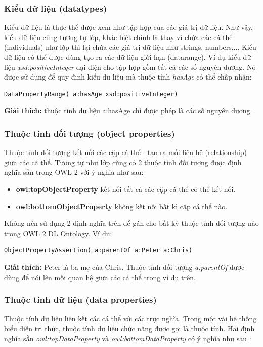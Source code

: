 \subsubsection{Kiểu dữ liệu (datatypes)}
Kiểu dữ liệu là thực thể được xem như tập hợp của các giá trị dữ liệu. Như vậy, kiểu dữ liệu cũng tương tự lớp, khác biệt chính là thay vì chứa các cá thể (individuals) như lớp thì lại chứa các giá trị dữ liệu như strings, numbers,... Kiểu dữ liệu có thể được dùng tạo ra các dữ liệu giới hạn (datarange). Ví dụ kiểu dữ liệu \textit{xsd:positiveInteger} đại diện cho tập hợp gồm tất cả các số nguyên dương. Nó được sử dụng để quy định kiểu dữ liệu mà thuộc tính \textit{hasAge} có thể chấp nhận:


\begin{verbatim}
DataPropertyRange( a:hasAge xsd:positiveInteger) 
\end{verbatim}

\textbf{Giải thích:} thuộc tính dữ liệu a:hasAge chỉ được phép là các số nguyên dương.

\subsubsection{Thuộc tính đối tượng (object properties)} 
Thuộc tính đối tượng kết nối các cặp cá thể - tạo ra mối liên hệ (relationship) giữa các cá thể. Tương tự như lớp cũng có 2 thuộc tính đối tượng được định nghĩa sẵn trong OWL 2 với ý nghĩa như sau:

\begin{itemize}
\item \textbf{owl:topObjectProperty} kết nối tất cả các cặp cá thể có thể kết nối.
\item \textbf{owl:bottomObjectProperty} không kết nối bất kì cặp cá thể nào. 
\end{itemize}
Không nên sử dụng 2 định nghĩa trên để gán cho bất kỳ thuộc tính đối tượng nào trong OWL 2 DL Ontology. Ví dụ:

\begin{verbatim}
ObjectPropertyAssertion( a:parentOf a:Peter a:Chris)  
\end{verbatim}
\textbf{Giải thích:} Peter là ba mẹ của Chris. Thuộc tính đối tượng \textit{a:parentOf} được dùng để nói lên mối quan hệ giữa các cá thể trong ví dụ trên.


\subsubsection{Thuộc tính dữ liệu (data properties)}
Thuộc tính dữ liệu liên kết các cá thể với các trực nghĩa. Trong một vài hệ thống biểu diễn tri thức, thuộc tính dữ liệu chức năng được gọi là thuộc tính.
Hai định nghĩa sẵn \textit{owl:topDataProperty} và \textit{owl:bottomDataProperty} có ý nghĩa như sau :

